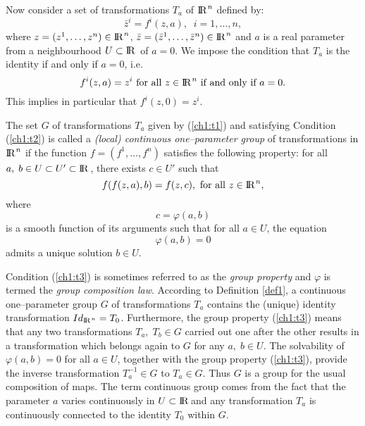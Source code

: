 Now consider a set of transformations $T_a$ of $\mathrm{I\!R\!}^{\;n}$  defined by:
\begin{equation}
\label{ch1:t1}
\bar z^i=f^i(z,a),\;\;i=1,\ldots,n,                               
\end{equation}
where $z=(z^1,\ldots,z^n)\in \mathrm{I\!R\!}^{\;n}$,
$\bar z=(\bar z^1,\ldots,\bar z^n)\in \mathrm{I\!R\!}^{\;n}$
and $a$ is a real parameter from a
neighbourhood $U\subset \mathrm{I\!R\!}\;$ of $a=0$.
We impose the condition  that $T_a$ is the identity
if and only if $a=0 $, i.e.
\begin{equation}
\label{ch1:t2}
 f^i(z,a)=z^i  \mbox{ for all } z\in \mathrm{I\!R\!}^{\;n} \mbox{ if and only if } a=0.
\end{equation}
This implies in particular that $f^i(z,0)=z^i$.
\begin{defi}
\begin{em}
\label{def1}
The set $G$ of transformations $T_a$ given by (\ref{ch1:t1}) and
satisfying Condition (\ref{ch1:t2}) is
called a {\em (local) continuous one--parameter group} of transformations
in $\mathrm{I\!R\!}^{\;n}$ if
the function $f=(f^1,\ldots,f^n)$ satisfies the following property:
for all $a,\;b\in U\subset U' \subset \mathrm{I\!R\!}\;$, there exists $c\in U'$ such that
\begin{equation}
\label{ch1:t3}
f(f(z,a),b)=f(z,c),\mbox{ for all $z\in \mathrm{I\!R\!}^{\;n} $},
\end{equation}
where
\begin{equation}
\label{ch1:t4}
c=\varphi (a,b)
\end{equation}
is a smooth function of its arguments such that for all $a\in U$, the equation
\[ \varphi (a,b)=0\]
admits a unique solution $b\in U$.
\end{em}
\end{defi}
Condition
(\ref{ch1:t3}) is sometimes referred to as the {\em group property} and $\varphi$
is termed the {\em group composition law}. According to Definition \ref{def1},
a continuous one--parameter group $G$  of transformations $T_a$ contains the
(unique) identity transformation $Id_{\mathrm{I\!R\!}^{\;n}}=T_0$. Furthermore, the group
property (\ref{ch1:t3}) means that any two transformations $T_a,\;T_b\in G$ carried
out one after the other results in a transformation which belongs again to $G$
for any $a,\;b\in U$. The solvability of  $\varphi (a,b)=0$ for all $a\in U$,
together with the group property (\ref{ch1:t3}), provide the inverse transformation
$T_a^{-1}\in G$ to $T_a\in G$. Thus $G$ is a group for the usual composition
of maps. The term continuous group comes from the fact that the parameter
$a$ varies continuously in $U\subset \mathrm{I\!R\!}$ and any transformation $T_a$
is continuously connected to the identity $T_0$ within $G$.

